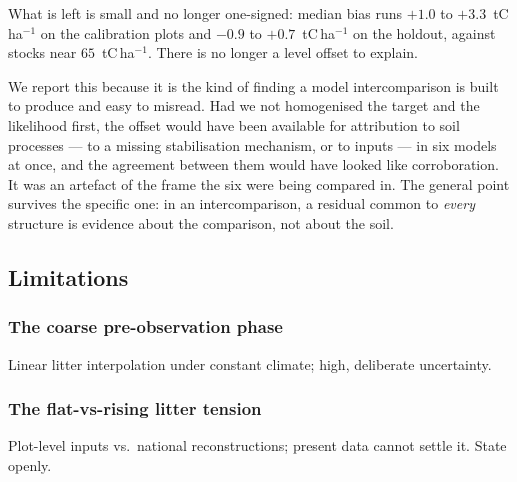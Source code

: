 \documentclass[11pt]{article}
\begin{document}
What is left is small and no longer one-signed: median bias runs
$+1.0$ to $+3.3$~tC\,ha$^{-1}$ on the calibration plots and $-0.9$ to
$+0.7$~tC\,ha$^{-1}$ on the holdout, against stocks near $65$~tC\,ha$^{-1}$.
There is no longer a level offset to explain.

We report this because it is the kind of finding a model intercomparison is
built to produce and easy to misread. Had we not homogenised the target and the
likelihood first, the offset would have been available for attribution to soil
processes --- to a missing stabilisation mechanism, or to inputs --- in six
models at once, and the agreement between them would have looked like
corroboration. It was an artefact of the frame the six were being compared in.
The general point survives the specific one: in an intercomparison, a residual
common to \emph{every} structure is evidence about the comparison, not about the
soil.

\subsection{Limitations}

\subsubsection{The coarse pre-observation phase}
Linear litter interpolation under constant climate; high, deliberate
uncertainty.

\subsubsection{The flat-vs-rising litter tension}
Plot-level inputs vs.\ national reconstructions; present data cannot settle
it. State openly.

\end{document}
